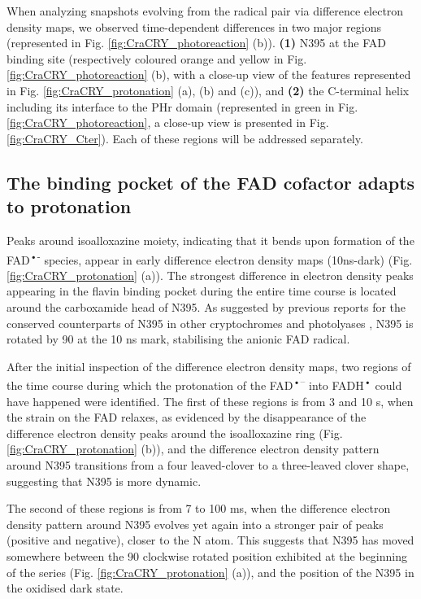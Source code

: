 When analyzing snapshots evolving from the radical pair via difference electron density maps, we observed time-dependent differences in two major regions (represented in Fig. \ref{fig:CraCRY_photoreaction} (b)). \textbf{(1)} N395 at the FAD binding site (respectively coloured orange and yellow in Fig. \ref{fig:CraCRY_photoreaction} (b), with a close-up view of the features represented in Fig. \ref{fig:CraCRY_protonation} (a), (b) and (c)), and \textbf{(2)} the C-terminal helix  including its interface to the PHr domain (represented in green in Fig. \ref{fig:CraCRY_photoreaction}, a close-up view is presented in Fig. \ref{fig:CraCRY_Cter}). Each of these regions will be addressed separately.

\subsection{The binding pocket of the FAD cofactor adapts to protonation}

Peaks around  isoalloxazine moiety, indicating that it bends upon formation of the FAD\textsuperscript{•-} species, appear in early difference electron density maps (10ns-dark) (Fig. \ref{fig:CraCRY_protonation} (a)). The strongest difference in electron density peaks appearing in the flavin binding pocket during the entire time course is located around the carboxamide head of N395. As suggested by previous reports for the conserved counterparts of N395 in other cryptochromes and photolyases \parencite{maestre-reynaSerialCrystallographyCaptures2022,wijayaSingleHydrogenBond2016,iwataKeyDynamicsConserved2010}, N395 is rotated by 90 \degree at the 10 ns mark, stabilising the anionic FAD radical. 

After the initial inspection of the difference electron density maps, two regions of the time course during which the protonation of the FAD\textsuperscript{•–} into FADH\textsuperscript{•} could have happened were identified. The first of these regions is from 3 and 10 \textmu s, when the strain on the FAD relaxes, as evidenced by the disappearance of the difference electron density peaks around the isoalloxazine ring (Fig. \ref{fig:CraCRY_protonation} (b)), and the difference electron density pattern around N395 transitions from a four leaved-clover to a three-leaved clover shape, suggesting that N395 is more dynamic. 

The second of these regions is from 7 to 100 ms, when the difference electron density pattern around N395 evolves yet again into a stronger pair of peaks (positive and negative), closer to the N atom. This suggests that N395 has moved somewhere between the 90 \degree clockwise rotated position exhibited at the beginning of the series (Fig. \ref{fig:CraCRY_protonation} (a)), and the position of the N395 in the oxidised dark state. 

